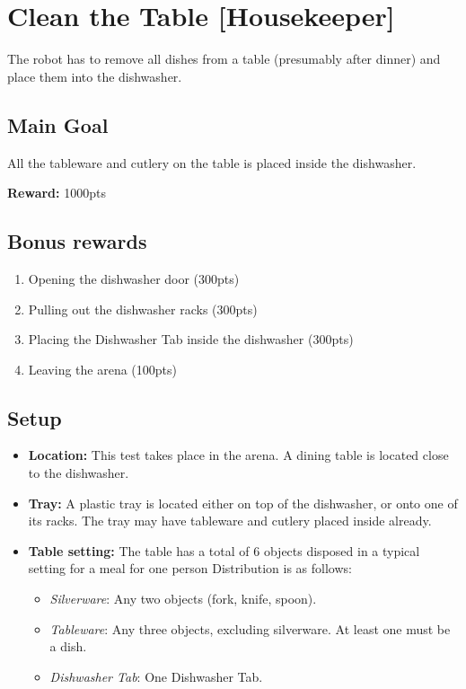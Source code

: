 \section{Clean the Table [Housekeeper]}
\label{test:clean-the-table}
The robot has to remove all dishes from a table (presumably after dinner) and place them into the dishwasher.


\subsection*{Main Goal}
All the tableware and cutlery on the table is placed inside the dishwasher.

\noindent\textbf{Reward:} 1000pts

\subsection*{Bonus rewards}
\begin{enumerate}[nosep]
	\item Opening the dishwasher door (300pts)
	\item Pulling out the dishwasher racks (300pts)
	\item Placing the Dishwasher Tab inside the dishwasher (300pts)
	\item Leaving the arena (100pts)
\end{enumerate}

\subsection*{Setup}
\begin{itemize}[nosep]
	\item \textbf{Location:} This test takes place in the arena. A dining table is located close to the dishwasher.
	\item \textbf{Tray:} A plastic tray is located either on top of the dishwasher, or onto one of its racks. The tray may have tableware and cutlery placed inside already.
	\item \textbf{Table setting:} The table has a total of 6 objects disposed in a typical setting for a meal for one person
	Distribution is as follows:
	\begin{itemize}[nosep]
		\item\textit{Silverware}: Any two objects (fork, knife, spoon).
		\item\textit{Tableware}: Any three objects, excluding silverware. At least one must be a dish.
		\item\textit{Dishwasher Tab}: One Dishwasher Tab.
	\end{itemize}
\end{itemize}


